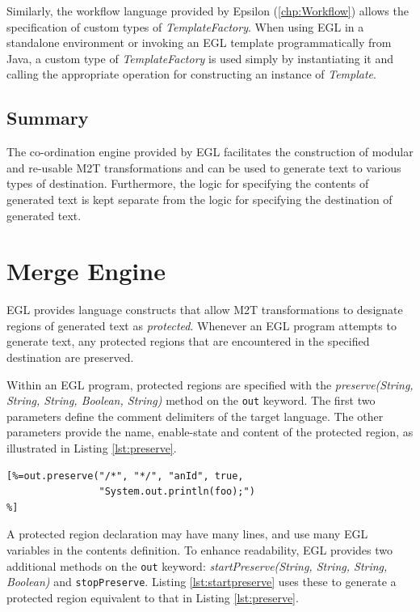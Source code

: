 Similarly, the workflow language provided by Epsilon (\ref{chp:Workflow}) allows the
specification of custom types of \emph{TemplateFactory}. When using EGL in a standalone
environment or invoking an EGL template programmatically from Java, a custom type of
\emph{TemplateFactory} is used simply by instantiating it and calling the appropriate 
operation for constructing an instance of \emph{Template}.


\subsection{Summary}
The co-ordination engine provided by EGL facilitates the construction
of modular and re-usable M2T transformations and can be used to generate 
text to various types of destination. Furthermore, the logic for 
specifying the contents of generated text is kept separate 
from the logic for specifying the destination of generated text.

\section{Merge Engine}
EGL provides language constructs that allow M2T transformations to
designate regions of generated text as \textit{protected}. Whenever 
an EGL program attempts to generate text, any protected regions that
are encountered in the specified destination are preserved.

Within an EGL program, protected regions are specified with the \emph{preserve(String, String,
  String, Boolean, String)} method on the \verb|out| keyword. The first two parameters define the comment delimiters of the target language. The other parameters provide the name,
enable-state and content of the protected region, as
illustrated in Listing \ref{lst:preserve}. 

\begin{lstlisting}[basicstyle=\ttfamily\footnotesize, language=EGL, tabsize=2, flexiblecolumns=true, caption=Protected region declaration using the preserve method., label=lst:preserve]
[%=out.preserve("/*", "*/", "anId", true,
                "System.out.println(foo);")
%]
\end{lstlisting}

A protected region declaration may have many lines, and use many EGL
variables in the contents definition.  To enhance readability, EGL
provides two additional methods on the \verb|out| keyword:
\emph{startPreserve(String, String, String, Boolean)} and
\verb|stopPreserve|.  Listing \ref{lst:startpreserve} uses these to
generate a protected region equivalent to that in Listing
\ref{lst:preserve}.

